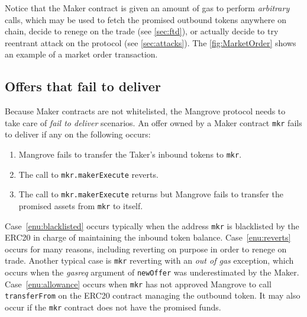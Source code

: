 \documentclass[12pt]{extarticle}
\begin{document}
Notice that the Maker contract is given an amount of gas to perform \emph{arbitrary} calls, which may be used to fetch the promised outbound tokens anywhere on chain, decide to renege on the trade (see \autoref{sec:ftd}), or actually decide to try reentrant attack on the protocol (see \autoref{sec:attacks}). The \autoref{fig:MarketOrder} shows an example of a market order transaction.

\subsection{Offers that fail to deliver}\label{sec:ftd}

Because Maker contracts are not whitelisted, the Mangrove protocol needs to take care of \emph{fail to deliver} scenarios.
An offer owned by a Maker contract \texttt{mkr} fails to deliver if any on the following occurs:
\begin{enumerate}
\item Mangrove fails to transfer the Taker's inbound tokens to \texttt{mkr}. \label{enu:blacklisted}
\item The call to \texttt{mkr.makerExecute} reverts. \label{enu:reverts}
\item The call to \texttt{mkr.makerExecute} returns but Mangrove fails to transfer the promised assets from \texttt{mkr} to itself. \label{enu:allowance}
\end{enumerate}

Case~\ref{enu:blacklisted} occurs typically when the address \texttt{mkr} is blacklisted by the ERC20 in charge of maintaining the inbound token balance. Case~\ref{enu:reverts} occurs for many reasons, including reverting on purpose in order to renege on trade. Another typical case is \texttt{mkr} reverting with an \emph{out of gas} exception, which occurs when the \emph{gasreq} argument of \texttt{newOffer} was underestimated by the Maker. Case~\ref{enu:allowance} occurs when \texttt{mkr} has not approved Mangrove to call \texttt{transferFrom} on the ERC20 contract managing the outbound token. It may also occur if the \texttt{mkr} contract does not have the promised funds.
\end{document}
